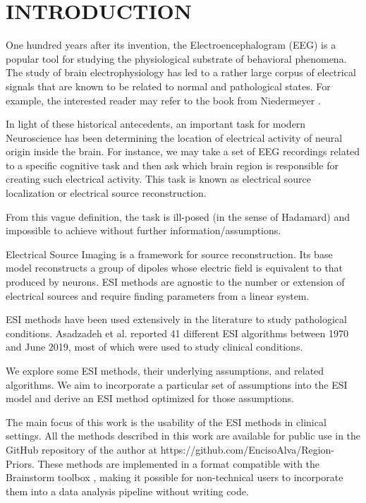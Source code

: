 \chapter{INTRODUCTION}
\label{ch:intro}

One hundred years after its invention, the Electroencephalogram (EEG) is a popular tool for studying the physiological substrate of behavioral phenomena.
%
The study of brain electrophysiology has led to a rather large corpus of electrical signals that are known to be related to normal and pathological states.
%
For example, the interested reader may refer to the book from Niedermeyer \cite{niedermeyer2011niedermeyer}.

In light of these historical antecedents, an important task for modern Neuroscience has been determining the location of electrical activity of neural origin inside the brain. 
%
For instance, we may take a set of EEG recordings related to a specific cognitive task and then ask which brain region is responsible for creating such electrical activity.
%
This task is known as electrical source localization or electrical source reconstruction.

From this vague definition, the task is ill-posed (in the sense of Hadamard) and impossible to achieve without further information/assumptions.

Electrical Source Imaging is a framework for source reconstruction. Its base model reconstructs a group of dipoles whose electric field is equivalent to that produced by neurons.
%
ESI methods are agnostic to the number or extension of electrical sources and require finding parameters from a linear system.

ESI methods have been used extensively in the literature to study pathological conditions.
%
Asadzadeh et al. reported 41 different ESI algorithms between 1970 and June 2019, most of which were used to study clinical conditions.

We explore some ESI methods, their underlying assumptions, and related algorithms.
%
We aim to incorporate a particular set of assumptions into the ESI model and derive an ESI method optimized for those assumptions.

The main focus of this work is the usability of the ESI methods in clinical settings.
%
All the methods described in this work are available for public use in the GitHub repository of the author at 
https://github.com/EncisoAlva/Region-Priors.
%
These methods are implemented in a format compatible with the Brainstorm toolbox \cite{brainstorm}, making it possible for non-technical users to incorporate them into a data analysis pipeline without writing code.

